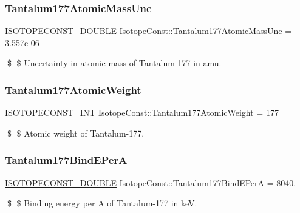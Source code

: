 \subsubsection{\texorpdfstring{Tantalum177\+Atomic\+Mass\+Unc}{Tantalum177AtomicMassUnc}}
{\footnotesize\ttfamily \mbox{\hyperlink{group___isotope_const-_macros_ga8f45a7272ce02c0b4c65c44636ed719a}{I\+S\+O\+T\+O\+P\+E\+C\+O\+N\+S\+T\+\_\+\+D\+O\+U\+B\+LE}} Isotope\+Const\+::\+Tantalum177\+Atomic\+Mass\+Unc = 3.\+557e-\/06}

\$ \$ Uncertainty in atomic mass of Tantalum-\/177 in amu. \mbox{\label{group___isotope_const-_tantalum-_ta177_ga7d0686d171f354232d662809046b2e6c}} 
\subsubsection{\texorpdfstring{Tantalum177\+Atomic\+Weight}{Tantalum177AtomicWeight}}
{\footnotesize\ttfamily \mbox{\hyperlink{group___isotope_const-_macros_ga5f18360b3e99483a35c32d789e62621c}{I\+S\+O\+T\+O\+P\+E\+C\+O\+N\+S\+T\+\_\+\+I\+NT}} Isotope\+Const\+::\+Tantalum177\+Atomic\+Weight = 177}

\$ \$ Atomic weight of Tantalum-\/177. \mbox{\label{group___isotope_const-_tantalum-_ta177_ga6c317366bb3c755eff2d4ada2dd33762}} 
\subsubsection{\texorpdfstring{Tantalum177\+Bind\+E\+PerA}{Tantalum177BindEPerA}}
{\footnotesize\ttfamily \mbox{\hyperlink{group___isotope_const-_macros_ga8f45a7272ce02c0b4c65c44636ed719a}{I\+S\+O\+T\+O\+P\+E\+C\+O\+N\+S\+T\+\_\+\+D\+O\+U\+B\+LE}} Isotope\+Const\+::\+Tantalum177\+Bind\+E\+PerA = 8040.}

\$ \$ Binding energy per A of Tantalum-\/177 in keV. \mbox{\label{group___isotope_const-_tantalum-_ta177_gae0f62a20d10ad4461c7bb3fa9a613948}} 
